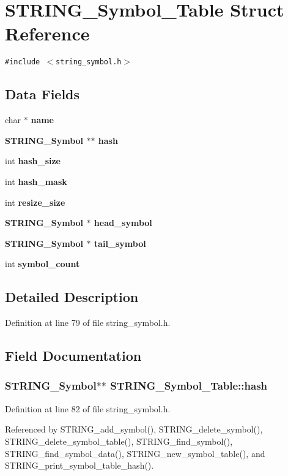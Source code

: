 \section{STRING\_\-Symbol\_\-Table Struct Reference}
\label{structSTRING__Symbol__Table}
{\tt \#include $<$string\_\-symbol.h$>$}

\subsection*{Data Fields}
\begin{CompactItemize}
\item 
char $\ast$ \bf{name}
\item 
\bf{STRING\_\-Symbol} $\ast$$\ast$ \bf{hash}
\item 
int \bf{hash\_\-size}
\item 
int \bf{hash\_\-mask}
\item 
int \bf{resize\_\-size}
\item 
\bf{STRING\_\-Symbol} $\ast$ \bf{head\_\-symbol}
\item 
\bf{STRING\_\-Symbol} $\ast$ \bf{tail\_\-symbol}
\item 
int \bf{symbol\_\-count}
\end{CompactItemize}


\subsection{Detailed Description}




Definition at line 79 of file string\_\-symbol.h.

\subsection{Field Documentation}
\subsubsection{\setlength{\rightskip}{0pt plus 5cm}\bf{STRING\_\-Symbol}$\ast$$\ast$ \bf{STRING\_\-Symbol\_\-Table::hash}}\label{structSTRING__Symbol__Table_47f9e98212d61a6a10ff75ceb0410104}




Definition at line 82 of file string\_\-symbol.h.

Referenced by STRING\_\-add\_\-symbol(), STRING\_\-delete\_\-symbol(), STRING\_\-delete\_\-symbol\_\-table(), STRING\_\-find\_\-symbol(), STRING\_\-find\_\-symbol\_\-data(), STRING\_\-new\_\-symbol\_\-table(), and STRING\_\-print\_\-symbol\_\-table\_\-hash().
